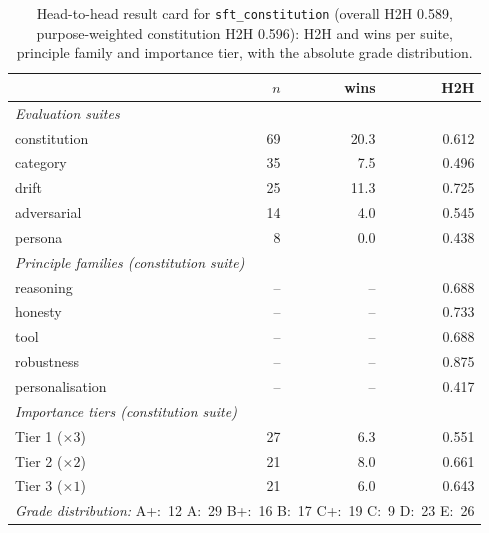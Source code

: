 \begin{table}[t]
  \centering
  \caption{Head-to-head result card for \texttt{sft\_constitution} (overall H2H 0.589, purpose-weighted constitution H2H 0.596): H2H and wins per suite, principle family and importance tier, with the absolute grade distribution.}
  \label{tab:rank-card-sft-constitution}
  \begin{tabular}{lrrr}
    \toprule
    & $n$ & wins & H2H \\
    \midrule
    \multicolumn{4}{l}{\emph{Evaluation suites}} \\
    \quad constitution & 69 & 20.3 & 0.612 \\
    \quad category & 35 & 7.5 & 0.496 \\
    \quad drift & 25 & 11.3 & 0.725 \\
    \quad adversarial & 14 & 4.0 & 0.545 \\
    \quad persona & 8 & 0.0 & 0.438 \\
    \midrule
    \multicolumn{4}{l}{\emph{Principle families (constitution suite)}} \\
    \quad reasoning & -- & -- & 0.688 \\
    \quad honesty & -- & -- & 0.733 \\
    \quad tool & -- & -- & 0.688 \\
    \quad robustness & -- & -- & 0.875 \\
    \quad personalisation & -- & -- & 0.417 \\
    \midrule
    \multicolumn{4}{l}{\emph{Importance tiers (constitution suite)}} \\
    \quad Tier 1 ($\times 3$) & 27 & 6.3 & 0.551 \\
    \quad Tier 2 ($\times 2$) & 21 & 8.0 & 0.661 \\
    \quad Tier 3 ($\times 1$) & 21 & 6.0 & 0.643 \\
    \midrule
    \multicolumn{4}{l}{\emph{Grade distribution:} A+:~12 \quad A:~29 \quad B+:~16 \quad B:~17 \quad C+:~19 \quad C:~9 \quad D:~23 \quad E:~26} \\
    \bottomrule
  \end{tabular}
\end{table}
